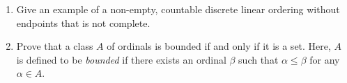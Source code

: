 \documentclass{amsart}
\theoremstyle{definition}
\begin{document}
\begin{enumerate}
\begin{enumerate}
  \end{enumerate}
\item Give an example of a non-empty, countable discrete linear ordering without endpoints that is not complete.
\item Prove that a class $A$ of ordinals is bounded if and only if it is a set. Here, $A$ is defined to be \emph{bounded} if there exists an ordinal $\beta$ such that $\alpha \le \beta$ for any $\alpha \in A$. 
\end{enumerate}
\end{document}
